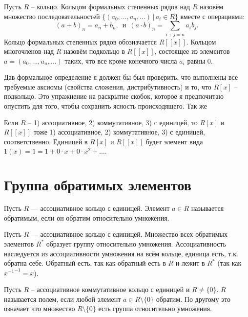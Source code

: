  Пусть $R$ -- кольцо. Кольцом формальных степенных рядов над $R$ назовём множество последовательностей $\{(a_0,\dots,a_n, \dots)\,|\, a_i\in R\}$ вместе с операциями:
$$ (a+b)_n=a_n+b_n, \, \text{ и } \, (a\cdot b)_n=\sum_{i+j=n}a_ib_j.$$
Кольцо формальных степенных рядов обозначается $R[[x]]$. Кольцом многочленов над $R$ назовём подкольцо в $R[[x]]$,
состоящее из элементов $a=(a_0,\dots,a_n,\dots)$ таких, что все кроме конечного числа $a_i$ равны $0$.
\edfn

Дав формальное определение я должен бы был проверить, что выполнены все требуемые аксиомы (свойства сложения, дистрибутивность) и то, что $R[x]$ -- подкольцо. Это упражнение на раскрытие скобок, которое я предпочитаю опустить для того, чтобы сохранить ясность происходящего. Так же

\rm Если $R$ -- 1) ассоциативное, 2) коммутативное, 3) с единицей, то $R[x]$ и $R[[x]]$ тоже 1) ассоциативное, 2) коммутативное, 3) с единицей, соответственно.
Единицей в $R[x]$ и $R[[x]]$ будет элемент вида $1(x)=1=1+0\cdot x+0\cdot x^2+\dots$.
\erm


\section{Группа обратимых элементов}

 Пусть $R$ — ассоциативное кольцо с единицей. Элемент $a\in R$ называется обратимым, если он обратим относительно умножения.
\edfn

 Пусть $R$ --- ассоциативное кольцо с единицей. Множество всех обратимых элементов $R^*$ образует группу относительно умножения.
\elm
\proof Ассоциативность наследуется из ассоциативности умножения на всём кольце, единица есть, т.к. обратна себе. Обратный есть, так как обратный есть в $R$ и лежит в $R^*$ (так как ${x^{-1}}^{-1}=x$).
\endproof

\dfn[Поле] Пусть $R$ -- ассоциативное коммутативное кольцо с единицей и $R\neq \{0\}$. $R$ называется полем, если   любой элемент $ a\in R\setminus\{0\}$ обратим. По другому это означает что множество $R\setminus\{0\}$ есть группа относительно умножения.
\edfn



